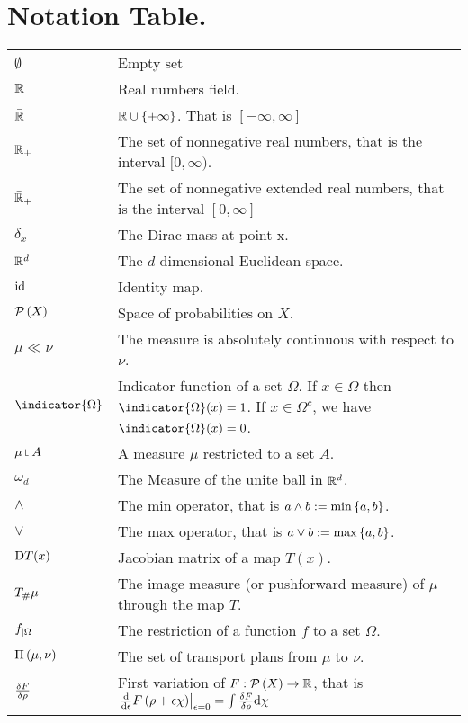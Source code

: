 \chapter*{Notation Table.}
\begin{tabular}{ l l }
	$\emptyset$ & Empty set \\
	$\mathbb{R}$ & Real numbers field. \\ 
	$\bar{\mathbb{R}}$ & $ \mathbb{R} \cup \left\lbrace +\infty \right\rbrace$. That is $[-\infty, \infty]$ \\
	$\mathbb{R}_+ $ & The set of nonnegative real numbers, that is the interval $[0, \infty)$.\\
	$\bar{\mathbb{R}}_+$ & The set of nonnegative extended real numbers, that is the interval $[0, \infty]$\\
	$\delta_x$ & The Dirac mass at point x. \\
	$\mathbb{R}^d $ & The $d$-dimensional Euclidean space.\\
	$\mathrm{id}$ & Identity map.\\
	$\mathcal{P}\left( X \right)$ & Space of probabilities on $X$. \\	
	$\mu \ll\nu$ & The measure is absolutely continuous with respect to $\nu$. \\
	$\indicator{\Omega} $ & Indicator function of a set $\Omega$. If $x\in \Omega$ then $\indicator{\Omega}(x)=1$. If $x\in \Omega^c$, we have $\indicator{\Omega}(x)=0$.\\
	$\mu \measurerestr A$ & A measure $\mu$ restricted to a set $A$.\\
	$\omega_d$ & The Measure of the unite ball in $\mathbb{R}^d$. \\
	$\wedge$ & The min operator, that is $a\wedge b:=\min\left\lbrace a,b \right\rbrace$. \\
	$\vee$ & The max operator, that is $a\vee b:=\max\left\lbrace a,b \right\rbrace$. \\
	$\mathrm{D} T(x)$ & Jacobian matrix of a map $T(x)$. \\
	${T}_{\#} \mu$ &  The image measure (or pushforward measure) of $\mu$ through the map $T$.\\
	${f}_{\left| \Omega \right.}$ & The restriction of a function $f$ to a set $\Omega$. \\
	$\Pi\left(\mu, \nu\right)$ & The set of transport plans from $\mu$ to $\nu$.\\
	$\frac{\delta F}{\delta \rho}$ &  First variation of $F:\mathcal{P}\left( X \right) \rightarrow \mathbb{R}$, that is $\left.\frac{\mathrm{d}}{\mathrm{d}\epsilon}F\left(\rho +\epsilon\chi\right)\right|_{\epsilon=0}=\int\frac{\delta F}{\delta \rho}\mathrm{d}\chi$\\

\end{tabular}
